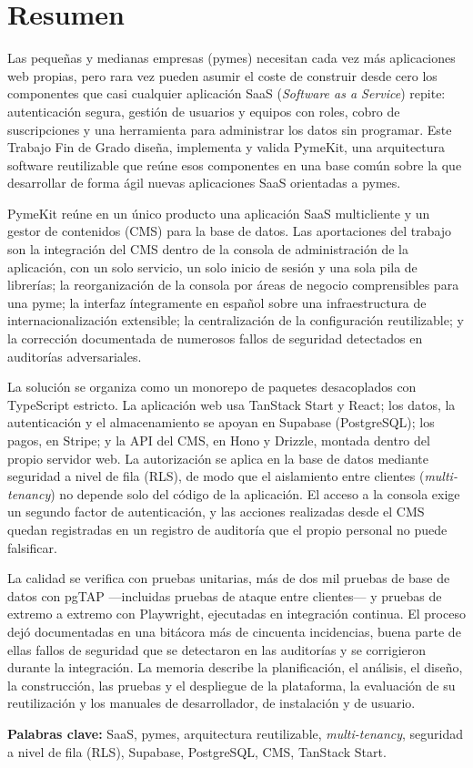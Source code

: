 \chapter*{Resumen}

\noindent Las pequeñas y medianas empresas (pymes) necesitan cada vez más
aplicaciones web propias, pero rara vez pueden asumir el coste de construir
desde cero los componentes que casi cualquier aplicación SaaS
(\textit{Software as a Service}) repite: autenticación segura, gestión de
usuarios y equipos con roles, cobro de suscripciones y una herramienta para
administrar los datos sin programar. Este Trabajo Fin de Grado diseña,
implementa y valida PymeKit, una arquitectura software reutilizable que reúne
esos componentes en una base común sobre la que desarrollar de forma ágil
nuevas aplicaciones SaaS orientadas a pymes.

PymeKit reúne en un único producto una aplicación SaaS multicliente y un
gestor de contenidos (CMS) para la base de datos. Las aportaciones del trabajo
son la integración del CMS dentro de la consola de
administración de la aplicación, con un solo servicio, un solo inicio de
sesión y una sola pila de librerías; la reorganización de la consola por
áreas de negocio comprensibles para una pyme; la interfaz íntegramente en
español sobre una infraestructura de internacionalización extensible; la
centralización de la configuración reutilizable; y la corrección documentada
de numerosos fallos de seguridad detectados en auditorías adversariales.

La solución se organiza como un monorepo de paquetes desacoplados con
TypeScript estricto. La aplicación web usa TanStack Start y React; los datos,
la autenticación y el almacenamiento se apoyan en Supabase (PostgreSQL); los
pagos, en Stripe; y la API del CMS, en Hono y Drizzle, montada dentro del
propio servidor web. La autorización se aplica en la base de datos mediante
seguridad a nivel de fila (RLS), de modo que el aislamiento entre clientes
(\textit{multi-tenancy}) no depende solo del código de la aplicación. El
acceso a la consola exige un segundo factor de autenticación, y las acciones
realizadas desde el CMS quedan registradas en un registro de auditoría que el
propio personal no puede falsificar.

La calidad se verifica con pruebas unitarias, más de dos mil pruebas de base
de datos con pgTAP ---incluidas pruebas de ataque entre clientes--- y pruebas
de extremo a extremo con Playwright, ejecutadas en integración continua. El
proceso dejó documentadas en una bitácora más de cincuenta incidencias, buena
parte de ellas fallos de seguridad que se detectaron en las auditorías y se
corrigieron durante la integración. La memoria describe la planificación, el
análisis, el diseño, la construcción, las pruebas y el despliegue de la
plataforma, la evaluación de su reutilización y los manuales de
desarrollador, de instalación y de usuario.

\vspace{.5cm}

\noindent \textbf{Palabras clave:} SaaS, pymes, arquitectura reutilizable,
\textit{multi-tenancy}, seguridad a nivel de fila (RLS), Supabase, PostgreSQL,
CMS, TanStack Start.
